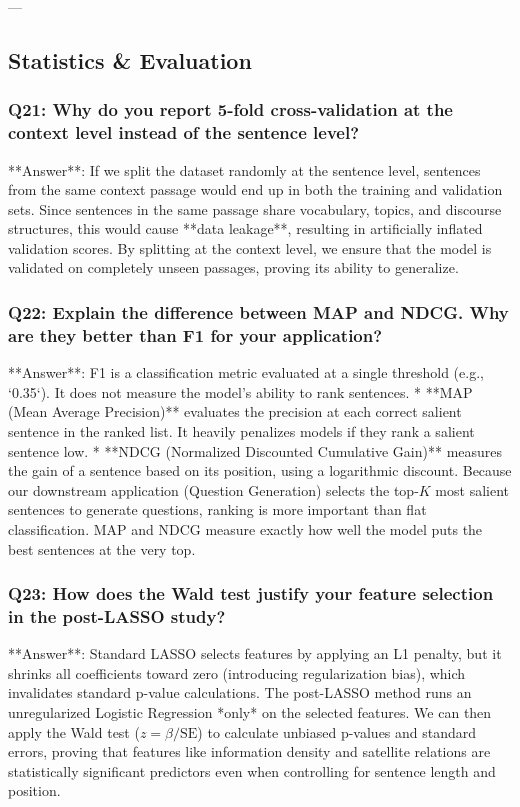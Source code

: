 \documentclass[11pt,a4paper]{article}
\begin{document}
---

\subsection{Statistics \& Evaluation}

\subsubsection{Q21: Why do you report 5-fold cross-validation at the context level instead of the sentence level?}
**Answer**: If we split the dataset randomly at the sentence level, sentences from the same context passage would end up in both the training and validation sets. Since sentences in the same passage share vocabulary, topics, and discourse structures, this would cause **data leakage**, resulting in artificially inflated validation scores. 
By splitting at the context level, we ensure that the model is validated on completely unseen passages, proving its ability to generalize.

\subsubsection{Q22: Explain the difference between MAP and NDCG. Why are they better than F1 for your application?}
**Answer**: F1 is a classification metric evaluated at a single threshold (e.g., `0.35`). It does not measure the model's ability to rank sentences. 
* **MAP (Mean Average Precision)** evaluates the precision at each correct salient sentence in the ranked list. It heavily penalizes models if they rank a salient sentence low.
* **NDCG (Normalized Discounted Cumulative Gain)** measures the gain of a sentence based on its position, using a logarithmic discount. 
Because our downstream application (Question Generation) selects the top-$K$ most salient sentences to generate questions, ranking is more important than flat classification. MAP and NDCG measure exactly how well the model puts the best sentences at the very top.

\subsubsection{Q23: How does the Wald test justify your feature selection in the post-LASSO study?}
**Answer**: Standard LASSO selects features by applying an L1 penalty, but it shrinks all coefficients toward zero (introducing regularization bias), which invalidates standard p-value calculations. 
The post-LASSO method runs an unregularized Logistic Regression *only* on the selected features. We can then apply the Wald test ($z = \beta/\text{SE}$) to calculate unbiased p-values and standard errors, proving that features like information density and satellite relations are statistically significant predictors even when controlling for sentence length and position.
\end{document}
